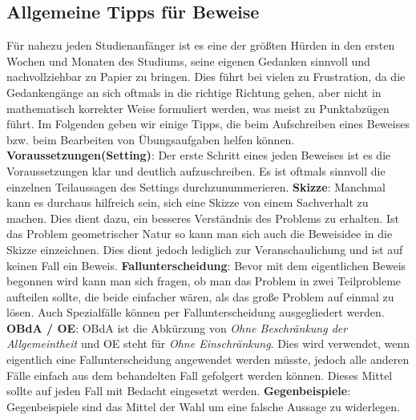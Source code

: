 \subsection{Allgemeine Tipps für Beweise}

Für nahezu jeden Studienanfänger ist es eine der größten Hürden in den ersten Wochen und Monaten des Studiums, seine eigenen Gedanken sinnvoll und nachvollziehbar zu Papier zu bringen.
Dies führt bei vielen zu Frustration, da die Gedankengänge an sich oftmals in die richtige Richtung gehen, aber nicht in mathematisch korrekter Weise formuliert werden, was meist zu Punktabzügen führt. 
Im Folgenden geben wir einige Tipps, die beim Aufschreiben eines Beweises bzw. beim Bearbeiten von Übungsaufgaben helfen können. 
\newline 
\newline 
\textbf{Voraussetzungen(Setting)}:\newline 
Der erste Schritt eines jeden Beweises ist es die Voraussetzungen klar und deutlich aufzuschreiben. 
Es ist oftmals sinnvoll die einzelnen Teilaussagen des Settings durchzunummerieren. 
\newline\newline  
\textbf{Skizze}:\newline 
Manchmal kann es durchaus hilfreich sein, sich eine Skizze von einem Sachverhalt zu machen. Dies dient dazu, ein besseres Verständnis des Problems zu erhalten. 
Ist das Problem geometrischer Natur so kann man sich auch die Beweisidee in die Skizze einzeichnen. Dies dient jedoch lediglich zur Veranschaulichung und ist auf keinen Fall ein Beweis. 
\newline\newline 
\textbf{Fallunterscheidung}:\newline
Bevor mit dem eigentlichen Beweis begonnen wird kann man sich fragen, ob man das Problem in zwei Teilprobleme aufteilen sollte, die beide einfacher wären, als das große Problem auf einmal zu lösen. 
Auch Spezialfälle können per Fallunterscheidung ausgegliedert werden. 
\newline\newline 
\textbf{OBdA / OE}:\newline
OBdA ist die Abkürzung von \textit{Ohne Beschränkung der Allgemeintheit} und OE steht für \textit{Ohne Einschränkung}. Dies wird verwendet, wenn eigentlich eine Fallunterscheidung angewendet werden müsste, jedoch alle anderen Fälle einfach aus dem behandelten Fall gefolgert werden können. 
Dieses Mittel sollte auf jeden Fall mit Bedacht eingesetzt werden. 
\newline\newline 
\textbf{Gegenbeispiele}:\newline
Gegenbeispiele sind das Mittel der Wahl um eine falsche Aussage zu widerlegen. 
\newline\newline 

